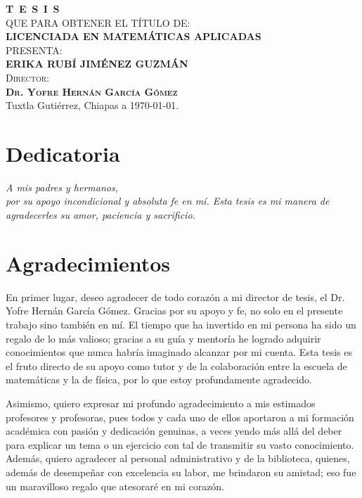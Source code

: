 \documentclass[
  spanish,
  letterpaper,
]{scrreprt}
\theoremstyle{definition}
\theoremstyle{remark}
\begin{document}
\begin{titlepage}
\begin{minipage}[t][0.95\textheight][c]{0.76\textwidth}
\begin{center}
                \textsc{\huge \textbf{T\, E\, S\, I\, S}}\\[1.5cm]
                \textsc{\large QUE PARA OBTENER EL TÍTULO DE:}\\[0.3cm]
                \textbf{\textsc{LICENCIADA EN MATEMÁTICAS APLICADAS}}\\[1.5cm]
                \textsc{\large PRESENTA:}\\[0.3cm]
                \textbf{\textsc{\large {ERIKA RUBÍ JIMÉNEZ GUZMÁN}}}\\[2cm]
                {\large\scshape Director:\\[0.3cm]
                {\textbf{\large Dr. Yofre Hernán García Gómez }}}\\[2.0cm]
                \large{Tuxtla Gutiérrez, Chiapas a \today.}

            \end{center}
\end{minipage}
\end{titlepage}

\pagebreak[2]

\chapter*{Dedicatoria}
\begin{flushright}
\textit{A mis padres y hermanos, \\ por su apoyo incondicional y absoluta fe en mí. Esta tesis es mi manera de agradecerles su amor, paciencia y sacrificio.}
\end{flushright}

\chapter*{Agradecimientos}
En primer lugar, deseo agradecer de todo corazón a mi director de tesis, el Dr. Yofre Hernán García Gómez. Gracias por su apoyo y fe, no solo en el presente trabajo sino también en mí. El tiempo que ha invertido en mi persona ha sido un regalo de lo más valioso; gracias a su guía y mentoría he logrado adquirir conocimientos que nunca habría imaginado alcanzar por mi cuenta. Esta tesis es el fruto directo de su apoyo como tutor y de la colaboración entre la escuela de matemáticas y la de física, por lo que estoy profundamente agradecido.

Asimismo, quiero expresar mi profundo agradecimiento a mis estimados profesores y profesoras, pues todos y cada uno de ellos aportaron a mi formación académica con pasión y dedicación genuinas, a veces yendo más allá del deber para explicar un tema o un ejercicio con tal de transmitir su vasto conocimiento. Además, quiero agradecer al personal administrativo y de la biblioteca, quienes, además de desempeñar con excelencia su labor, me brindaron su amistad; eso fue un maravilloso regalo que atesoraré en mi corazón.
\end{document}
